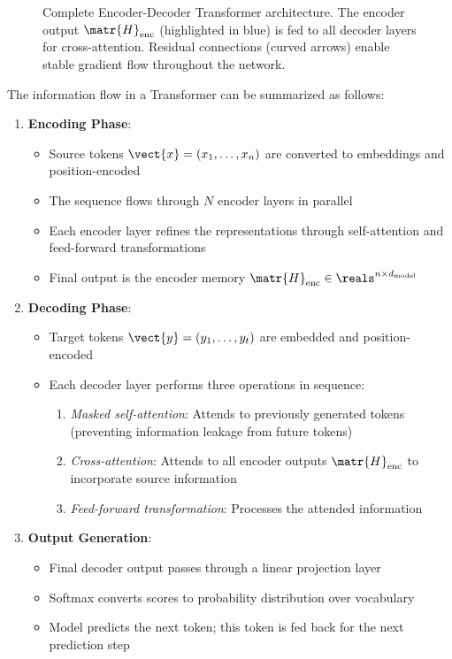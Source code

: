 \begin{figure}[ht+bp]
\begin{tikzpicture}[scale=1.2, transform shape]
  \end{tikzpicture}
  \caption{Complete Encoder-Decoder Transformer architecture. The encoder output $\matr{H}_{\text{enc}}$ (highlighted in blue) is fed to all decoder layers for cross-attention. Residual connections (curved arrows) enable stable gradient flow throughout the network.}
  \label{fig:transformer-architecture}
\end{figure}


\newpage
The information flow in a Transformer can be summarized as follows:
\begin{enumerate}[leftmargin=*]
  \item \textbf{Encoding Phase}:
    \begin{itemize}
      \item Source tokens $\vect{x} = (x_1, \ldots, x_n)$ are converted to embeddings and position-encoded
      \item The sequence flows through $N$ encoder layers in parallel
      \item Each encoder layer refines the representations through self-attention and feed-forward transformations
      \item Final output is the encoder memory $\matr{H}_{\text{enc}} \in \reals^{n \times d_{\text{model}}}$
    \end{itemize}

  \item \textbf{Decoding Phase}:
    \begin{itemize}
      \item Target tokens $\vect{y} = (y_1, \ldots, y_t)$ are embedded and position-encoded
      \item Each decoder layer performs three operations in sequence:
        \begin{enumerate}
          \item \textit{Masked self-attention}: Attends to previously generated tokens (preventing information leakage from future tokens)
          \item \textit{Cross-attention}: Attends to all encoder outputs $\matr{H}_{\text{enc}}$ to incorporate source information
          \item \textit{Feed-forward transformation}: Processes the attended information
        \end{enumerate}
    \end{itemize}

  \item \textbf{Output Generation}:
    \begin{itemize}
      \item Final decoder output passes through a linear projection layer
      \item Softmax converts scores to probability distribution over vocabulary
      \item Model predicts the next token; this token is fed back for the next prediction step
    \end{itemize}
\end{enumerate}



